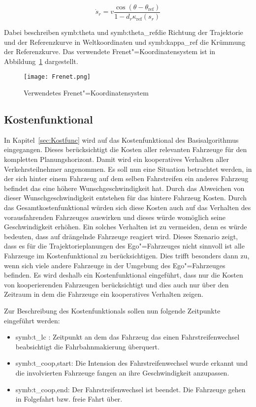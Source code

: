 \begin{equation}
   \dot{s}_r = v \frac{\cos(\theta - \theta_\mathrm{ref})}{1 - d_r \kappa_\mathrm{ref}(s_r)}
\end{equation}

Dabei beschreiben \gls{symb:theta} und \gls{symb:theta_ref}die Richtung der Trajektorie und der Referenzkurve in Weltkoordinaten und \gls{symb:kappa_ref} die Kr\"ummung der Referenzkurve.
Das verwendete Frenet"=Koordinatensystem ist in Abbildung~\ref{fig:Frenet} dargestellt.

\begin{figure}[!htbp]
    \centering
    \texttt{[image: Frenet.png]}
    \caption[Frenet"=Koordinatensystem]{Verwendetes Frenet"=Koordinatensystem \cite{Rathgeber2016}}
    \label{fig:Frenet}
\end{figure}


\FloatBarrier


\subsection{Kostenfunktional}
\label{sec:LCKostfunc}
In Kapitel~\ref{sec:Kostfunc} wird auf das Kostenfunktional des Basisalgorithmus eingegangen.
Dieses ber\"ucksichtigt die Kosten aller relevanten Fahrzeuge f\"ur den kompletten Planungshorizont.
Damit wird ein kooperatives Verhalten aller Verkehrsteilnehmer angenommen.
Es soll nun eine Situation betrachtet werden, in der sich hinter einem Fahrzeug auf dem selben Fahrstreifen ein anderes Fahrzeug befindet das eine h\"ohere Wunschgeschwindigkeit hat.
Durch das Abweichen von dieser Wunschgeschwindigkeit entstehen f\"ur das hintere Fahrzeug Kosten.
Durch das Gesamtkostenfunktional w\"urden sich diese Kosten auch auf das Verhalten des vorausfahrenden Fahrzeuges auswirken und dieses w\"urde wom\"oglich seine Geschwindigkeit erh\"ohen.
Ein solches Verhalten ist zu vermeiden, denn es w\"urde bedeuten, dass auf dr\"angelnde Fahrzeuge reagiert wird.
Dieses Szenario zeigt, dass es f\"ur die Trajektorieplanungen des Ego"=Fahrzeuges nicht sinnvoll ist alle Fahrzeuge im Kostenfunktional zu ber\"ucksichtigen.
Dies trifft besonders dann zu, wenn sich viele andere Fahrzeuge in der Umgebung des Ego"=Fahrzeuges befinden.
Es wird deshalb ein Kostenfunktional eingef\"uhrt, dass nur die Kosten von kooperierenden Fahrzeugen ber\"ucksichtigt und dies auch nur \"uber den Zeitraum in dem die Fahrzeuge ein kooperatives Verhalten zeigen.

Zur Beschreibung des Kostenfunktionals sollen nun folgende Zeitpunkte eingef\"uhrt werden:
\begin{itemize}
\item \gls{symb:t_lc} : Zeitpunkt an dem das Fahrzeug das einen Fahrstreifenwechsel beabsichtigt die Fahrbahnmakierung \"uberquert.
\item \gls{symb:t_coop,start}: Die Intension des Fahrstreifenwechsel wurde erkannt und die involvierten Fahrzeuge fangen an ihre Geschwindigkeit anzupassen.
\item \gls{symb:t_coop,end}: Der Fahrstreifenwechsel ist beendet. Die Fahrzeuge gehen in Folgefahrt bzw. freie Fahrt \"uber.
\end{itemize}

